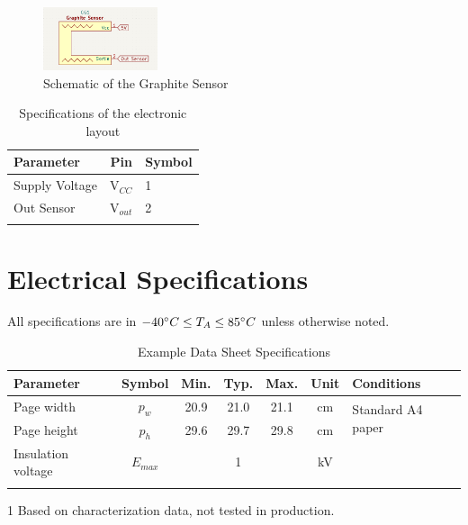 \documentclass[10pt]{datasheet}
\begin{document}
\begin{figure}[h!]
    \centering
    \captionsetup{justification=centering}
	\includegraphics[width=0.3\textwidth]{Cover/ElectricDiagramSensor.png}
	\caption{\small{Schematic of the Graphite Sensor}}
\end{figure}

\begin{table}[h]
\caption{Specifications of the electronic layout}
\begin{tabularx}{\textwidth}{l | c | X}
    \thickhline
    \textbf{Parameter} & \textbf{Pin} & \textbf{Symbol} \\
    \hline
    Supply Voltage & V$_{CC}$ & 1 \\ 
    \hline
    Out Sensor & V$_{out}$ & 2 \\
    \thickhline
\end{tabularx}
\end{table}

\section{Electrical Specifications}
All specifications are in $-40\degree C \leq T_A \leq 85\degree C$ unless otherwise noted.

\begin{table}[h]
\begin{threeparttable}
\caption{Example Data Sheet Specifications}
\begin{tabularx}{\textwidth}{l | c | c c c | c | X}
    \thickhline
    \textbf{Parameter} & \textbf{Symbol} & \textbf{Min.} & \textbf{Typ.} & \textbf{Max.} &
    \textbf{Unit} & \textbf{Conditions} \\
    \hline
    Page width  & $p_w$ & 20.9 & 21.0 & 21.1 & cm & \multirow{2}{*}{Standard A4 paper} \\
    Page height & $p_h$ & 29.6 & 29.7 & 29.8 & cm &  \\
    \hline
    Insulation voltage & $E_{max}$\tnote{1} & & 1 & & kV & \\
    \thickhline
\end{tabularx}
\begin{tablenotes}
\item[1]{Based on characterization data, not tested in production.}
\end{tablenotes}
\end{threeparttable}
\end{table}
\end{document}
